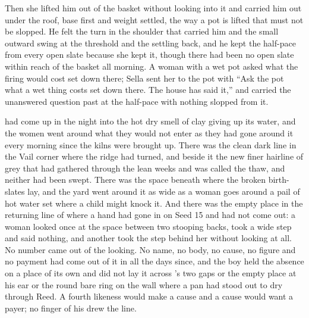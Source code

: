 Then she lifted him out of the basket without looking into it and carried him out under the roof, base first and weight settled, the way a pot is lifted that must not be slopped. He felt the turn in the shoulder that carried him and the small outward swing at the threshold and the settling back, and he kept the half-pace from every open slate because she kept it, though there had been no open slate within reach of the basket all morning. A woman with a wet pot asked what the firing would cost set down there; Sella sent her to the pot with “Ask the pot what a wet thing costs set down there. The house has said it,” and carried the unanswered question past at the half-pace with nothing slopped from it.

\scenebreak

 had come up in the night into the hot dry smell of clay giving up its water, and the women went around what they would not enter as they had gone around it every morning since the kilns were brought up. There was the clean dark line in the Vail corner where the  ridge had turned, and beside it the new finer hairline of grey that had gathered through the lean weeks and was called the thaw, and neither had been swept. There was the space beneath  where the broken birth-slates lay, and the yard went around it as wide as a woman goes around a pail of hot water set where a child might knock it. And there was the empty place in the returning line of  where a hand had gone in on Seed 15 and had not come out: a woman looked once at the space between two stooping backs, took a wide step and said nothing, and another took the step behind her without looking at all. No number came out of the looking. No name, no body, no cause, no figure and no payment had come out of it in all the days since, and the boy held the absence on a place of its own and did not lay it across 's two gaps or the empty place at his ear or the round bare ring on the wall where a pan had stood out to dry through Reed. A fourth likeness would make a cause and a cause would want a payer; no finger of his drew the line.

